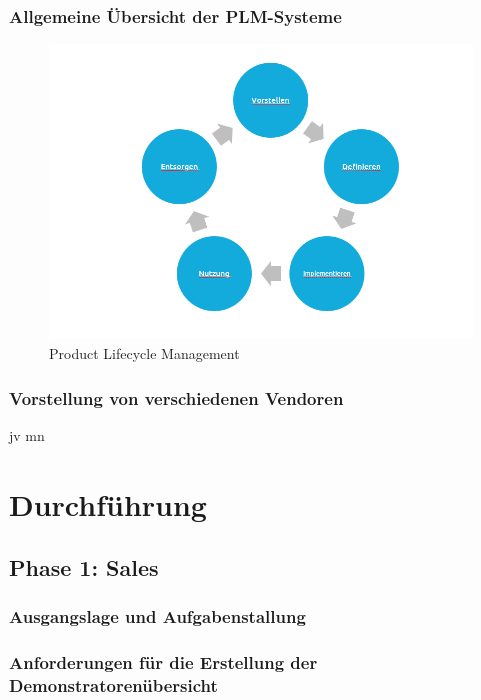 \documentclass[a4paper, 12pt]{scrartcl}
\begin{document}
	\subsubsection{Allgemeine Übersicht der PLM-Systeme}
	
	\begin{figure}[h!]
		\begin{center}
			\includegraphics[width=12cm]{PLM.png}
			\caption{ Product Lifecycle Management}
			\label{PLM}
		\end{center}
	\end{figure}


	\subsubsection{Vorstellung von verschiedenen Vendoren}
jv mn 
	\newpage
	\section{Durchführung}
	\subsection{Phase 1: Sales} 
	\subsubsection{Ausgangslage und Aufgabenstallung} %
	\subsubsection{Anforderungen für die Erstellung der Demonstratorenübersicht} %
\end{document}
